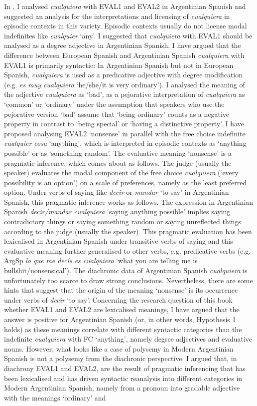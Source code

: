   In , I analysed \textit{cualquiera} with EVAL1 and EVAL2 in Argentinian Spanish and suggested an analysis for the interpretations and licensing of \textit{cualquiera} in episodic contexts in this variety. Episodic contexts usually do not license modal indefinites like \textit{cualquier} ‘any’. I suggested that \textit{cualquiera} with EVAL1 should be analysed as a degree adjective in Argentinian Spanish. I have argued that the difference between European Spanish and Argentinian Spanish \textit{cualquiera} with EVAL1 is primarily syntactic: In Argentinian Spanish but not in European Spanish, \textit{cualquiera} is used as a predicative adjective with degree modification (e.g. \textit{es muy cualquiera} ‘he/she/it is very ordinary’). I analysed the meaning of the adjective \textit{cualquiera} as ‘bad’, as a pejorative interpretation of \textit{cualquiera} as ‘common’ or ‘ordinary’ under the assumption that speakers who use the pejorative version ‘bad’ assume that ‘being ordinary’ counts as a negative property in contrast to ‘being special’ or ‘having a distinctive property’. I have proposed analysing EVAL2 ‘nonsense’ in parallel with the free choice indefinite \textit{cualquier cosa} ‘anything’, which is interpreted in episodic contexts as ‘anything possible’ or as ‘something random’. The evaluative meaning ‘nonsense’ is a pragmatic inference, which comes about as follows. The judge (usually the speaker) evaluates the modal component of the free choice \textit{cualquiera} (‘every possibility is an option’) on a scale of preferences, namely as the least preferred option. Under verbs of saying like \textit{decir} or \textit{mandar} ‘to say’ in Argentinian Spanish, this pragmatic inference works as follows. The expression in Argentinian Spanish \textit{decir/mandar cualquiera} ‘saying anything possible’ implies saying contradictory things or saying something random or saying unreflected things according to the judge (usually the speaker). This pragmatic evaluation has been lexicalised in Argentinian Spanish under transitive verbs of saying and this evaluative meaning further generalised to other verbs, e.g. predicative verbs (e.g. ArgSp \textit{lo que me decís es cualquiera} ‘what you are telling me is bullshit/nonsensical’). The diachronic data of Argentinian Spanish \textit{cualquiera} is unfortunately too scarce to draw strong conclusions. Nevertheless, there are some hints that suggest that the origin of the meaning ‘nonsense’ is its occurrence under verbs of \textit{decir} ‘to say’. Concerning the research question of this book whether EVAL1 and EVAL2 are lexicalised meanings, I have argued that the answer is positive for Argentinian Spanish (or, in other words, Hypothesis 1 holds) as these meanings correlate with different syntactic categories than the indefinite \textit{cualquiera} with FC ‘anything’, namely degree adjectives and evaluative nouns. However, what looks like a case of polysemy in Modern Argentinian Spanish is not a polysemy from the diachronic perspective. I argued that, in diachrony EVAL1 and EVAL2, are the result of pragmatic inferencing that has been lexicalised and has driven syntactic reanalysis into different categories in Modern Argentinian Spanish, namely from a pronoun into gradable adjective with the meanings ‘ordinary’ and 